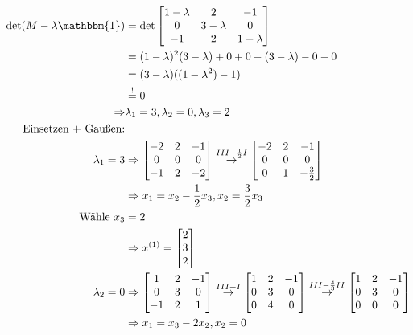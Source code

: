 \begin{align*}
\det(M-\lambda\mathbbm{1})&=\det\begin{bmatrix}
1-\lambda & 2 & -1\\
0 & 3 - \lambda & 0\\
-1 & 2 & 1-\lambda
\end{bmatrix}\\
&=(1-\lambda)^2(3-\lambda)+ 0+0-(3-\lambda)-0-0\\
&=(3-\lambda)((1-\lambda^2) -1)\\
&\overset{!}{=}0\\
\Rightarrow&\lambda_1 = 3, \lambda_2 = 0, \lambda_3 = 2\\
\text{Einsetzen + Gaußen:}\\
\lambda_1 = 3 &\Rightarrow \begin{bmatrix}
-2 & 2 & -1\\
0 & 0 & 0\\
-1 & 2 & -2
\end{bmatrix}\overset{III-\frac{1}{2}I}{\rightarrow}
\begin{bmatrix}
-2 & 2 & -1\\
0 & 0 & 0\\
0 & 1 & -\frac{3}{2}
\end{bmatrix}\\
&\Rightarrow x_1 = x_2 - \frac{1}{2}x_3, x_2 = \frac{3}{2}x_3\\
\text{Wähle } x_3 &= 2\\
&\Rightarrow x^{(1)} = \begin{bmatrix}
2\\
3\\
2
\end{bmatrix}\\
\lambda_2 = 0 &\Rightarrow \begin{bmatrix}
1 & 2 & -1\\
0 & 3 & 0 \\
-1 & 2 & 1
\end{bmatrix}\overset{III+I}{\rightarrow}
\begin{bmatrix}
1 & 2 & -1\\
0 & 3 & 0 \\
0 & 4 & 0
\end{bmatrix}\overset{III-\frac{4}{3}II}{\rightarrow}
\begin{bmatrix}
1 & 2 & -1\\
0 & 3 & 0 \\
0 & 0 & 0
\end{bmatrix}\\
&\Rightarrow x_1 = x_3 - 2x_2, x_2 = 0\\

\end{align*}
